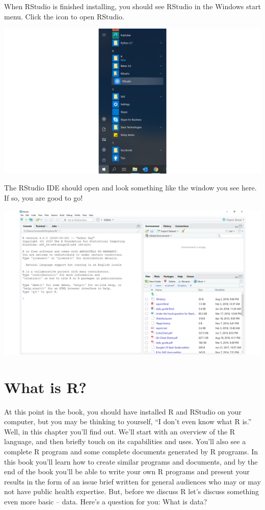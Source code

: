 \documentclass[
  letterpaper,
  DIV=11,
  numbers=noendperiod]{scrreprt}
\begin{document}
When RStudio is finished installing, you should see RStudio in the
Windows start menu. Click the icon to open RStudio.

\includegraphics{chapters/installing_r_and_rstudio/pc_view_rstudio1.png}

The RStudio IDE should open and look something like the window you see
here. If so, you are good to go! 🎉

\includegraphics{chapters/installing_r_and_rstudio/pc_view_rstudio2.png}

\chapter{What is R?}\label{what-is-r}

At this point in the book, you should have installed R and RStudio on
your computer, but you may be thinking to yourself, ``I don't even know
what R is.'' Well, in this chapter you'll find out. We'll start with an
overview of the R language, and then briefly touch on its capabilities
and uses. You'll also see a complete R program and some complete
documents generated by R programs. In this book you'll learn how to
create similar programs and documents, and by the end of the book you'll
be able to write your own R programs and present your results in the
form of an issue brief written for general audiences who may or may not
have public health expertise. But, before we discuss R let's discuss
something even more basic -- data. Here's a question for you: What is
data?
\end{document}
